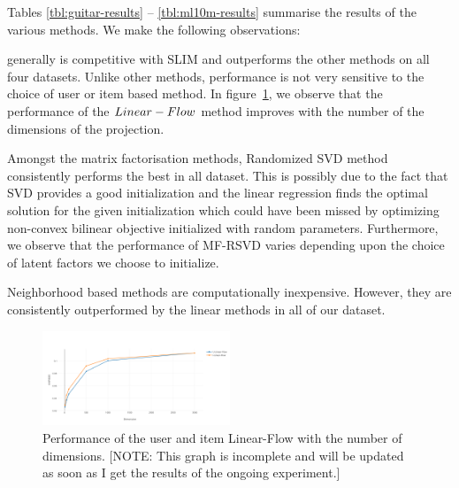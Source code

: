 Tables \ref{tbl:guitar-results} -- \ref{tbl:ml10m-results} summarise the results of the various methods.
We make the following observations:
\begin{compactitem}

\item \LinearLow generally is competitive with SLIM and outperforms the other methods on all four datasets. Unlike other methods, \LinearLow performance is not very sensitive to the choice of user or item based method. In figure~\ref{fig:dimensionPerformance}, we observe that the performance of the $Linear-Flow$ method improves with the number of the dimensions of the projection. 

\item Amongst the matrix factorisation methods, Randomized SVD method~\citep{Tang:2013} consistently performs the best in all dataset. This is possibly due to the fact that SVD provides a good initialization and the linear regression finds the optimal solution for the given initialization which could have been missed by optimizing non-convex bilinear objective initialized with random parameters. Furthermore, we observe that the performance of MF-RSVD varies depending upon the choice of latent factors we choose to initialize.

\item Neighborhood based methods are computationally inexpensive. However, they are consistently outperformed by the linear methods in all of our dataset.  %

\end{compactitem}


\begin{figure}[!ht]
 
  \caption{Performance of the user and item Linear-Flow with the number of dimensions. [NOTE: This graph is incomplete and will be updated as soon as I get the results of the ongoing experiment.]}
  \label{fig:dimensionPerformance}

  \centering
    \includegraphics[width=0.5\textwidth]{imgs/mapvsdim}
\end{figure}

